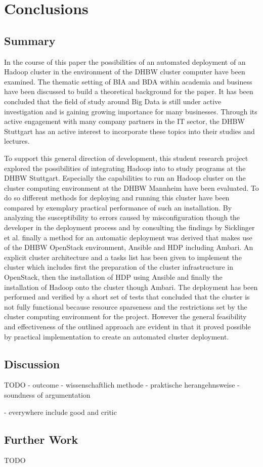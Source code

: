 \chapter{Conclusions}
\label{chap:conc}

\section{Summary}

In the course of this paper the possibilities of an automated deployment of an Hadoop cluster in the environment of the \ac{DHBW} cluster computer have been examined.
The thematic setting of \ac{BIA} and \ac{BDA} within academia and business have been discussed to build a theoretical background for the paper. 
It has been concluded that the field of study around Big Data is still under active investigation and is gaining growing importance for many businesses.
Through its active engagement with many company partners in the \ac{IT} sector, the \ac{DHBW} Stuttgart has an active interest to incorporate these topics into their studies and lectures.

To support this general direction of development, this student research project explored the possibilities of integrating Hadoop into to study programs at the \ac{DHBW} Stuttgart.
Especially the capabilities to run an Hadoop cluster on the cluster computing environment at the \ac{DHBW} Mannheim have been evaluated.
To do so different methods for deploying and running this cluster have been compared 
by exemplary practical performance of such an installation. 
By analyzing the susceptibility to errors caused by misconfiguration though the developer in the deployment process and by consulting the findings by Sicklinger et al. finally a method for an automatic deployment was derived that makes use of the \ac{DHBW} OpenStack environment, Ansible and \acf{HDP} including Ambari.
An explicit cluster architecture and a tasks list has been given to implement the cluster which includes first the preparation of the cluster infrastructure in OpenStack, then the installation of \ac{HDP} using Ansible and finally the installation of Hadoop onto the cluster though Ambari.
The deployment has been performed and verified by a short set of tests that concluded that the cluster is not fully functional because resource sparseness and the restrictions set by the cluster computing environment for the project.
However the general feasibility and effectiveness of the outlined approach are evident in that it proved possible by practical implementation to create an automated cluster deployment.

\section{Discussion}

TODO
- outcome
- wissenschaftlich methode
- praktische herangehnsweise
- soundness of argumentation

- everywhere include good and critic


\section{Further Work}

TODO
